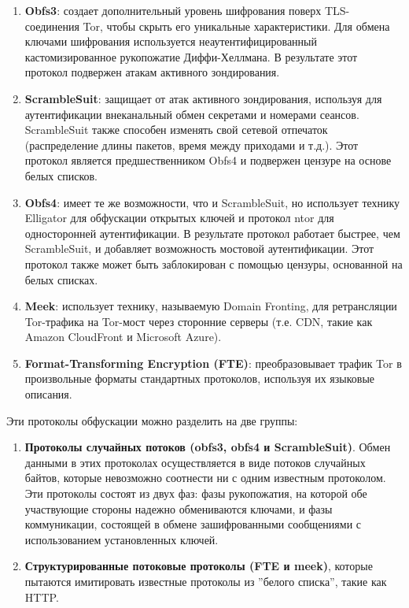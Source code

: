 \begin{enumerate}

    \item \textbf{Obfs3}: создает дополнительный уровень шифрования поверх TLS-соединения Tor, чтобы скрыть его уникальные характеристики.
    Для обмена ключами шифрования используется неаутентифицированный кастомизированное рукопожатие Диффи-Хеллмана.
    В результате этот протокол подвержен атакам активного зондирования.

    \item \textbf{ScrambleSuit}: защищает от атак активного зондирования, используя для аутентификации внеканальный обмен секретами и номерами сеансов.
    ScrambleSuit также способен изменять свой сетевой отпечаток (распределение длины пакетов, время между приходами и т.д.).
    Этот протокол является предшественником Obfs4 и подвержен цензуре на основе белых списков.

    \item \textbf{Obfs4}: имеет те же возможности, что и ScrambleSuit, но использует технику Elligator для обфускации открытых ключей
    и протокол ntor для односторонней аутентификации. В результате протокол работает быстрее, чем ScrambleSuit,
    и добавляет возможность мостовой аутентификации. Этот протокол также может быть заблокирован с помощью цензуры, основанной на белых списках.

    \item \textbf{Meek}: использует технику, называемую Domain Fronting, для ретрансляции Tor-трафика на Tor-мост через сторонние серверы
    (т.е. CDN, такие как Amazon CloudFront и Microsoft Azure).

    \item \textbf{Format-Transforming Encryption (FTE)}: преобразовывает трафик Tor в произвольные форматы стандартных протоколов, используя их языковые описания.

\end{enumerate}

Эти протоколы обфускации можно разделить на две группы:

\begin{enumerate}

    \item \textbf{Протоколы случайных потоков (obfs3, obfs4 и ScrambleSuit)}.
    Обмен данными в этих протоколах осуществляется в виде потоков случайных байтов,
    которые невозможно соотнести ни с одним известным протоколом.
    Эти протоколы состоят из двух фаз: фазы рукопожатия, на которой обе участвующие стороны надежно обмениваются ключами,
    и фазы коммуникации, состоящей в обмене зашифрованными сообщениями с использованием установленных ключей.

    \item \textbf{Структурированные потоковые протоколы (FTE и meek)},
    которые пытаются имитировать известные протоколы из ''белого списка'', такие как HTTP.

\end{enumerate}

